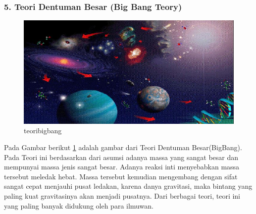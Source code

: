 \subsubsection{5. Teori Dentuman Besar (Big Bang Teory)}
\begin{figure} [ht]
	\centerline{\includegraphics[width=1\textwidth]{figures/teoribigbang.JPG}}
	\caption{teoribigbang}
	\label{teoribigbang}
	\end{figure}
	Pada Gambar berikut \ref{teoribigbang} adalah gambar dari Teori Dentuman Besar(BigBang).
Pada Teori ini berdasarkan dari asumsi adanya massa yang sangat besar dan mempunyai massa jenis sangat besar. Adanya reaksi inti menyebabkan massa tersebut meledak hebat. Massa tersebut kemudian mengembang dengan sifat sangat cepat menjauhi pusat ledakan, karena danya gravitasi, maka bintang yang paling kuat gravitasinya akan menjadi pusatnya.
Dari berbagai teori, teori ini yang paling banyak didukung oleh para ilmuwan.


